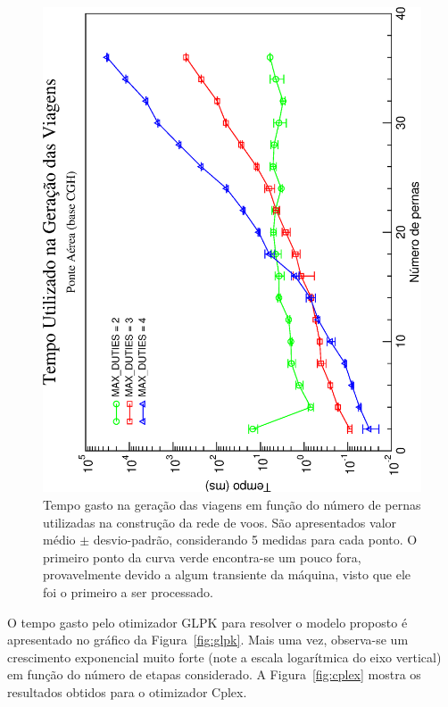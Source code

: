 \begin{figure}[htb]
	\begin{center}
		\includegraphics[scale=0.45,angle=-90]{fig/generation_time.eps}
		\caption{Tempo gasto na geração das viagens em função do número de pernas utilizadas na 
		construção da rede de voos. São apresentados valor médio $\pm$ desvio-padrão, considerando 5 
		medidas para cada ponto. O primeiro ponto da curva verde encontra-se um pouco fora,
		provavelmente devido a algum transiente da máquina, visto que ele foi o primeiro a
		ser processado.}
		\label{fig:generation}
	\end{center}
\end{figure}

O tempo gasto pelo otimizador GLPK para resolver o modelo proposto é apresentado no gráfico da 
Figura~\ref{fig:glpk}. Mais uma vez, observa-se um crescimento exponencial muito forte (note a 
escala logarítmica do eixo vertical) em função do número de etapas considerado. A 
Figura~\ref{fig:cplex} mostra os resultados obtidos para o otimizador Cplex. 

